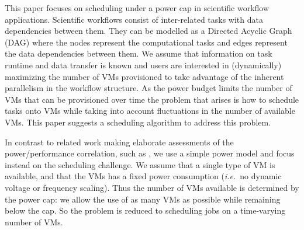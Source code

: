\documentclass[10pt, conference, compsocconf]{IEEEtran} %
\newcommand{\ie}{\textit{i.e.}\ }
\begin{document}

This paper focuses on scheduling under a power cap in scientific workflow applications.
Scientific workflows \cite{deelmanbook} consist of inter-related tasks with data dependencies between them.
They can be modelled as a Directed Acyclic Graph (DAG) where the nodes represent the computational tasks and edges represent the data dependencies between them.
We assume that information on task runtime and data transfer is known and users are interested in (dynamically) maximizing the number of VMs provisioned to take advantage of the inherent parallelism in the workflow structure.
As the power budget limits the number of VMs that can be provisioned over time the problem that arises is how to schedule tasks onto VMs while taking into account fluctuations in the number of available VMs.
This paper suggests a scheduling algorithm to address this problem.

In contrast to related work making elaborate assessments of the power/performance correlation, such as \cite{bailey2014adaptive}, we use a simple power model and focus instead on the scheduling challenge.
We assume that a single type of VM is available, and that the VMs has a fixed power consumption (\ie no dynamic voltage or frequency scaling).
Thus the number of VMs available is determined by the power cap: we allow the use of as many VMs as possible while remaining below the cap.
So the problem is reduced to scheduling jobs on a time-varying number of VMs.
\end{document}
